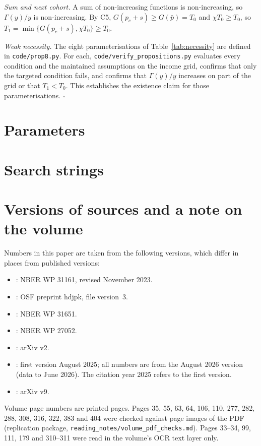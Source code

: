 \documentclass[12pt]{article}
\theoremstyle{remark}
\begin{document}
\emph{Sum and next cohort.} A sum of non-increasing functions is non-increasing, so $\Gamma(y)/y$ is non-increasing. By C5, $G(p_c+s)\ge G(\bar p)=T_0$ and $\chi T_0\ge T_0$, so $T_1=\min\{G(p_c+s),\chi T_0\}\ge T_0$.

\emph{Weak necessity.} The eight parameterisations of Table~\ref{tab:necessity} are defined in \texttt{code/prop8.py}. For each, \texttt{code/verify\_propositions.py} evaluates every condition and the maintained assumptions on the income grid, confirms that only the targeted condition fails, and confirms that $\Gamma(y)/y$ increases on part of the grid or that $T_1<T_0$. This establishes the existence claim for those parameterisations. $\square$

\section{Parameters}\label{app:params}


\section{Search strings}\label{app:search}


\section{Versions of sources and a note on the volume}\label{app:versions}\label{app:volume}
Numbers in this paper are taken from the following versions, which differ in places from published versions:
\begin{itemize}[itemsep=0pt]
\item \citet{brynjolfsson2025work}: NBER WP 31161, revised November 2023.
\item \citet{otis2026uneven}: OSF preprint hdjpk, file version~3.
\item \citet{dube2025policing}: NBER WP 31651.
\item \citet{acemoglu2020tax}: NBER WP 27052.
\item \citet{steyvers2025know}: arXiv v2.
\item \citet{brynjolfsson2025canaries}: first version August 2025; all numbers are from the August 2026 version (data to June 2026). The citation year 2025 refers to the first version.
\item \citet{ide2025automation}: arXiv v9.
\end{itemize}
Volume page numbers are printed pages. Pages 35, 55, 63, 64, 106, 110, 277, 282, 288, 308, 316, 322, 383 and 404 were checked against page images of the PDF (replication package, \texttt{reading\_notes/volume\_pdf\_checks.md}). Pages 33--34, 99, 111, 179 and 310--311 were read in the volume's OCR text layer only.
\end{document}
